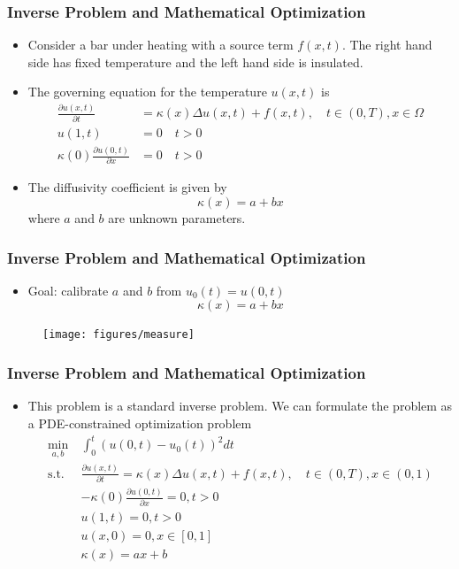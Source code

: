 \documentclass{beamer}
\begin{document}
\begin{frame}
	\frametitle{Inverse Problem and Mathematical Optimization}
	
	\begin{itemize}
		\item Consider a bar under heating with a source term $f(x,t)$. The right hand side has fixed temperature and the left hand side is insulated. 
		\item The governing equation for the temperature $u(x,t)$ is 
		\begin{align*}
			\frac{\partial u({x}, t)}{\partial t} &= \kappa(x)\Delta u({x}, t) + f({x}, t), \quad t\in (0,T), x\in \Omega\\
			u(1, t) &= 0 \quad t>0\\
			\kappa(0)\frac{\partial u(0,t)}{\partial x} &= 0 \quad t>0
		\end{align*}
		\item The diffusivity coefficient is given by 
		$$\kappa(x) = a + bx$$
		where $a$ and $b$ are unknown parameters. 
	\end{itemize}
\end{frame}

\begin{frame}
	\frametitle{Inverse Problem and Mathematical Optimization}
	\begin{itemize}
\item Goal: calibrate $a$ and $b$ from $u_0(t) = u(0, t)$
$$\kappa(x) = a + bx$$
	\end{itemize}	
	\begin{figure}
		\centering
		\texttt{[image: figures/measure]}
	\end{figure}

\end{frame}
\begin{frame}
	\frametitle{Inverse Problem and Mathematical Optimization}
	\begin{itemize}
		\item This problem is a standard inverse problem. We can formulate the problem as a PDE-constrained optimization problem
		$$\begin{aligned}
\min_{a, b}\ & \int_{0}^t ( u(0, t)- u_0(t))^2 dt\\
\mathrm{s.t.}\ & \frac{\partial u(x, t)}{\partial t} = \kappa(x)\Delta u(x, t) + f(x, t), \quad t\in (0,T), x\in (0,1) \\
& -\kappa(0)\frac{\partial u(0,t)}{\partial x} = 0, t>0\\
& u(1, t) = 0, t>0\\
& u(x, 0) = 0, x\in [0,1]\\
& \kappa(x) = a x + b
\end{aligned}$$

	\end{itemize}
\end{frame}
\end{document}
